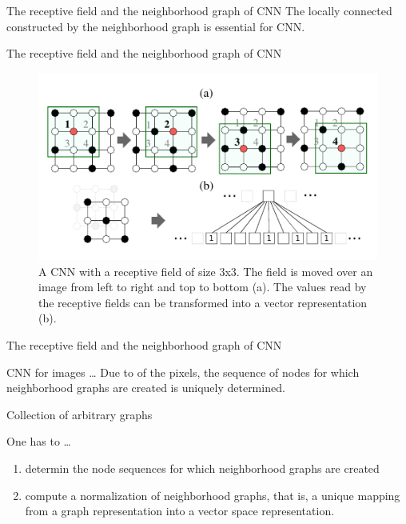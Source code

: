 \documentclass[dvipdfmx]{beamer}
\begin{document}
  \begin{frame}{The receptive field and the neighborhood graph of CNN}
    The locally connected  constructed by the \alert{neighborhood graph} is essential for CNN.
  \end{frame}

  \begin{frame}{The receptive field and the neighborhood graph of CNN}
    \begin{figure}[h]
      \centering
      \includegraphics[width=0.8\paperwidth]{img/Fig1.pdf}
      \caption{A CNN with a receptive field of size 3x3.
        The field is moved over an image from left to right and top to bottom (a).
        The values read by the receptive fields can be transformed into a vector representation (b).}
    \end{figure}
  \end{frame}

  \begin{frame}{The receptive field and the neighborhood graph of CNN}
    \begin{block}{CNN for images \dots}
      Due to  of the pixels, the sequence of nodes
      for which neighborhood graphs are created is \alert{uniquely determined.}
    \end{block}
  \end{frame}

  \begin{frame}{Collection of \alert{arbitrary} graphs}
    \begin{block}{One has to \dots}
      \begin{enumerate}
        \item determin the node sequences for which neighborhood graphs are created
        \item compute a \alert{normalization} of neighborhood graphs, that is,
          a unique mapping from a graph representation into a vector space representation.
      \end{enumerate}
    \end{block}

    \vspace{1cm}
  \end{frame}
\end{document}
